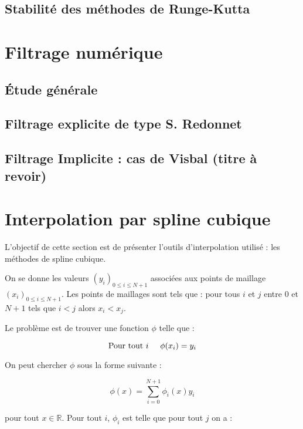\subsection{Stabilité des méthodes de Runge-Kutta}


\section{Filtrage numérique}

\subsection{\'Etude générale}

\subsection{Filtrage explicite de type S. Redonnet}

\subsection{Filtrage Implicite : cas de Visbal (titre à revoir)}


\section{Interpolation par spline cubique}

L'objectif de cette section est de présenter l'outils d'interpolation utilisé : les méthodes de spline cubique.

On se donne les valeurs $(y_i)_{0 \leq i \leq N+1}$ associées aux points de maillage $(x_i)_{0 \leq i \leq N+1}$. Les points de maillages sont tels que : pour tous $i$ et $j$ entre $0$ et $N+1$ tels que $i < j$ alors $x_i < x_j$.

Le problème est de trouver une fonction $\phi$ telle que :

\begin{equation}
\text{Pour tout } i \hspace{0.5cm}   \phi(x_i) = y_i
\end{equation}

On peut chercher $\phi$ sous la forme suivante :

\begin{equation}
\phi (x) = \sum_{i=0}^{N+1} \phi_i(x) y_i
\label{eq:interpolation fct caract}
\end{equation}

pour tout $x \in \mathbb{R}$. Pour tout $i$, $\phi_i$ est telle que pour tout $j$ on a :

